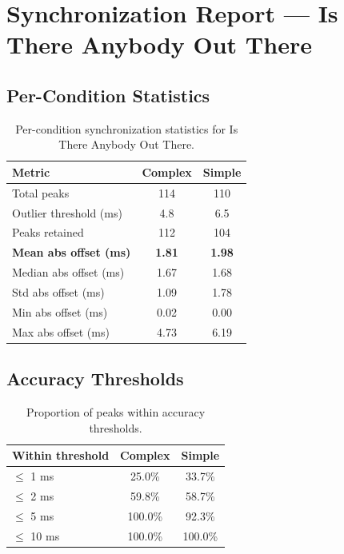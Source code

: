 
\section*{Synchronization Report --- Is There Anybody Out There}

\subsection*{Per-Condition Statistics}

\begin{table}[h!]
\centering
\begin{tabular}{|l|c|c|}
\hline
Metric & Complex & Simple \\
\hline
Total peaks & 114 & 110 \\
Outlier threshold (ms) & 4.8 & 6.5 \\
Peaks retained & 112 & 104 \\
\textbf{Mean abs offset (ms)} & \textbf{1.81} & \textbf{1.98} \\
Median abs offset (ms) & 1.67 & 1.68 \\
Std abs offset (ms) & 1.09 & 1.78 \\
Min abs offset (ms) & 0.02 & 0.00 \\
Max abs offset (ms) & 4.73 & 6.19 \\
\hline
\end{tabular}
\caption{Per-condition synchronization statistics for Is There Anybody Out There.}
\label{tab:sync_stats}
\end{table}

\subsection*{Accuracy Thresholds}

\begin{table}[h!]
\centering
\begin{tabular}{|l|c|c|}
\hline
Within threshold & Complex & Simple \\
\hline
$\leq$ 1 ms & 25.0\% & 33.7\% \\
$\leq$ 2 ms & 59.8\% & 58.7\% \\
$\leq$ 5 ms & 100.0\% & 92.3\% \\
$\leq$ 10 ms & 100.0\% & 100.0\% \\
\hline
\end{tabular}
\caption{Proportion of peaks within accuracy thresholds.}
\label{tab:sync_accuracy}
\end{table}

